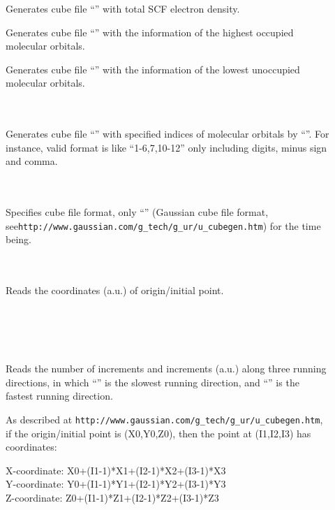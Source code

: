 \begin{description}
\item[]
  Generates cube file ``'' with total SCF electron density.

\item[]
  Generates cube file ``'' with the information of the highest
occupied molecular orbitals.

\item[]
  Generates cube file ``'' with the information of the lowest
unoccupied molecular orbitals.

\item[] \ \\
   \\
  Generates cube file ``'' with specified indices of molecular orbitals
by ``''. For instance, valid format is like ``1-6,7,10-12'' only including
digits, minus sign and comma.

\item[] \ \\
   \\
  Specifies cube file format, only ``'' (Gaussian cube file format,
see\linebreak \verb|http://www.gaussian.com/g_tech/g_ur/u_cubegen.htm|) for the
time being.

\item[] \ \\
   \\
  Reads the coordinates (a.u.) of origin/initial point.

\item[] \ \\
   \\
   \\
   \\
  Reads the number of increments and increments (a.u.) along three running directions,
in which ``'' is the slowest running direction, and ``''
is the fastest running direction.

As described at \verb|http://www.gaussian.com/g_tech/g_ur/u_cubegen.htm|, if the
origin/initial point is (X0,Y0,Z0), then the point at (I1,I2,I3) has coordinates:

X-coordinate: X0+(I1-1)*X1+(I2-1)*X2+(I3-1)*X3\\
Y-coordinate: Y0+(I1-1)*Y1+(I2-1)*Y2+(I3-1)*Y3\\
Z-coordinate: Z0+(I1-1)*Z1+(I2-1)*Z2+(I3-1)*Z3
\end{description}


